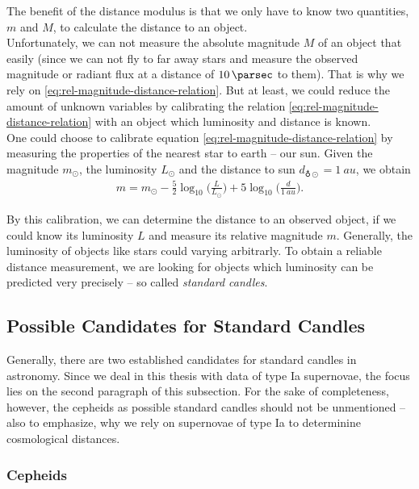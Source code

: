The benefit of the distance modulus is that we only have to know two quantities, $m$ and $M$, to calculate the distance to an object. \\
Unfortunately, we can not measure the absolute magnitude $M$ of an object that easily (since we can not fly to far away stars and measure the observed magnitude or radiant flux at a distance of $\SI{10}{\parsec}$ to them). That is why we rely on \eqref{eq:rel-magnitude-distance-relation}.
But at least, we could reduce the amount of unknown variables by calibrating the relation \eqref{eq:rel-magnitude-distance-relation} with an object which luminosity and distance is known. \\

\noindent One could choose to calibrate equation \eqref{eq:rel-magnitude-distance-relation} by measuring the properties of the nearest star to earth -- our sun. Given the magnitude $m_{\odot}$, the luminosity $L_{\odot}$ and the distance to sun $d_{\earth \odot} = \SI{1}{au}$, we obtain 
\begin{align}
    m = m_{\odot} - \frac{5}{2} \log_{10} \biggl(\frac{L}{L_{\odot}}\biggr) + 5 \log_{10} \biggl(\frac{d}{\SI{1}{au}}\biggr). 
\end{align}

\noindent By this calibration, we can determine the distance to an observed object, if we could know its luminosity $L$ and measure its relative magnitude $m$. Generally, the luminosity of objects like stars could varying arbitrarly. To obtain a reliable distance measurement, we are looking for objects which luminosity can be predicted very precisely -- so called \textit{standard candles}. \\



\subsection{Possible Candidates for Standard Candles} 

Generally, there are two established candidates for standard candles in astronomy. Since we deal in this thesis with data of type Ia supernovae, the focus lies on the second paragraph of this subsection. For the sake of completeness, however, the cepheids as possible standard candles should not be unmentioned -- also to emphasize, why we rely on supernovae of type Ia to determinine cosmological distances.

\subsubsection{Cepheids}


